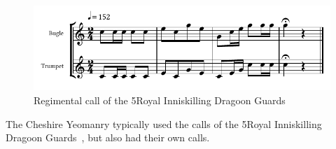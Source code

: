 \vspace{10mm}

\begin{figure}[h]
  \centering
  \includegraphics[width=\textwidth]{gazette/5ridg-call.pdf}
  \caption*{Regimental call of the 5\nth Royal Inniskilling Dragoon Guards~\cite[p3]{trumpet-and-bugle-calls}}
\end{figure}

\vfill

The Cheshire Yeomanry typically used the calls of the 5\nth Royal Inniskilling Dragoon Guards~\cite[p11]{trumpet-and-bugle-calls}, but also had their own calls.

\vfill

\pagebreak

\vspace*{10mm}


\vfill

